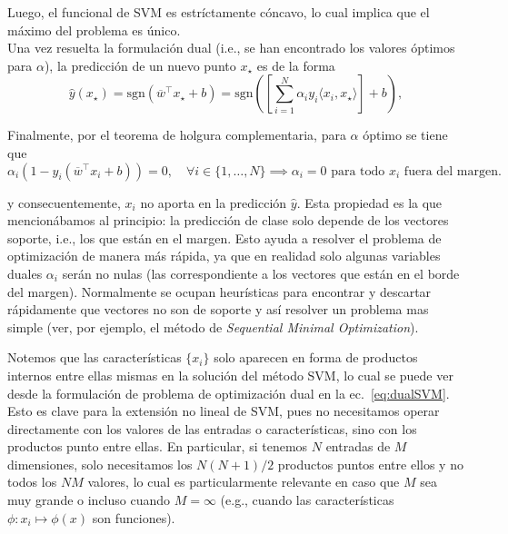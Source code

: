 Luego, el funcional de SVM es estríctamente cóncavo, lo cual implica que el máximo del problema es único.\\

 Una vez resuelta la formulación dual (i.e., se han encontrado los valores óptimos para $\alpha$), la predicción de un nuevo punto $x_\star$ es de la forma 
\begin{equation}
 	\hat{y}(x_\star)= \text{sgn} (\overline{w}^\top x_\star + b) = \text{sgn}\left(\left[\sum\limits_{i=1}^{N} \alpha_i y_i \langle x_i, x_\star\rangle\right] + b\right),
 \end{equation}
 
Finalmente, por el teorema de holgura complementaria, para $\alpha$ óptimo se tiene que
\begin{equation}
	\alpha_i \left(1-y_i (\overline{w}^\top x_i +b)\right) = 0,\quad \forall i\in\{1,\ldots,N\}\implies \alpha_i=0\text{ para todo $x_i$ fuera del margen.}
\end{equation}

y consecuentemente, $x_i$ no aporta en la predicción $\hat{y}$. Esta propiedad es la que mencionábamos al principio: la predicción de clase solo depende de los vectores soporte, i.e., los que están en el margen. Esto ayuda a resolver el problema de optimización de manera más rápida, ya que en realidad solo algunas variables duales $\alpha_i$ serán no nulas (las correspondiente a los vectores que están en el borde del margen). Normalmente se ocupan heurísticas para encontrar y descartar rápidamente que vectores no son de soporte y así resolver un problema mas simple (ver, por ejemplo, el método de \emph{Sequential Minimal Optimization}). 


\begin{remark} Notemos que las características $\{x_i\}$ solo aparecen en forma de productos internos entre ellas mismas en la solución del método SVM, lo cual se puede ver desde la formulación de problema de optimización dual en la ec.~\eqref{eq:dualSVM}. Esto es clave para la extensión no lineal de SVM, pues no necesitamos operar directamente  con los valores de las entradas o características, sino con los productos punto entre ellas. En particular, si tenemos $N$ entradas de $M$ dimensiones, solo necesitamos los $N(N+1)/2$ productos puntos entre ellos y no todos los $NM$ valores, lo cual es particularmente relevante en caso que $M$ sea muy grande o incluso cuando $M=\infty$ (e.g., cuando las características $\phi:x_i\mapsto \phi(x)$ son funciones).
\end{remark} 

